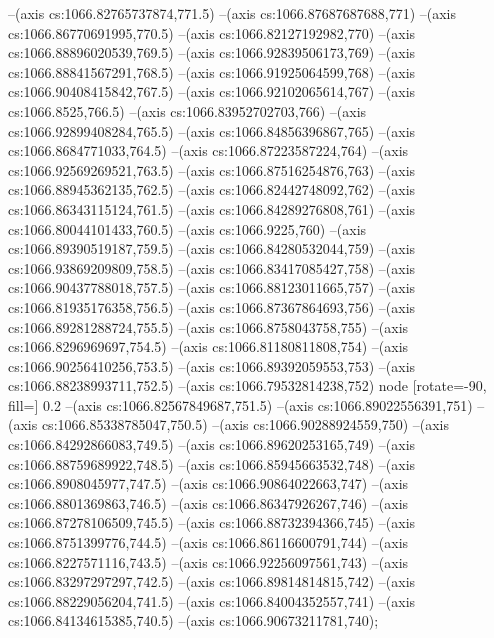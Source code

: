 --(axis cs:1066.82765737874,771.5)
--(axis cs:1066.87687687688,771)
--(axis cs:1066.86770691995,770.5)
--(axis cs:1066.82127192982,770)
--(axis cs:1066.88896020539,769.5)
--(axis cs:1066.92839506173,769)
--(axis cs:1066.88841567291,768.5)
--(axis cs:1066.91925064599,768)
--(axis cs:1066.90408415842,767.5)
--(axis cs:1066.92102065614,767)
--(axis cs:1066.8525,766.5)
--(axis cs:1066.83952702703,766)
--(axis cs:1066.92899408284,765.5)
--(axis cs:1066.84856396867,765)
--(axis cs:1066.8684771033,764.5)
--(axis cs:1066.87223587224,764)
--(axis cs:1066.92569269521,763.5)
--(axis cs:1066.87516254876,763)
--(axis cs:1066.88945362135,762.5)
--(axis cs:1066.82442748092,762)
--(axis cs:1066.86343115124,761.5)
--(axis cs:1066.84289276808,761)
--(axis cs:1066.80044101433,760.5)
--(axis cs:1066.9225,760)
--(axis cs:1066.89390519187,759.5)
--(axis cs:1066.84280532044,759)
--(axis cs:1066.93869209809,758.5)
--(axis cs:1066.83417085427,758)
--(axis cs:1066.90437788018,757.5)
--(axis cs:1066.88123011665,757)
--(axis cs:1066.81935176358,756.5)
--(axis cs:1066.87367864693,756)
--(axis cs:1066.89281288724,755.5)
--(axis cs:1066.8758043758,755)
--(axis cs:1066.8296969697,754.5)
--(axis cs:1066.81180811808,754)
--(axis cs:1066.90256410256,753.5)
--(axis cs:1066.89392059553,753)
--(axis cs:1066.88238993711,752.5)
--(axis cs:1066.79532814238,752) node [rotate=-90, fill=\bgcol] {0.2}
--(axis cs:1066.82567849687,751.5)
--(axis cs:1066.89022556391,751)
--(axis cs:1066.85338785047,750.5)
--(axis cs:1066.90288924559,750)
--(axis cs:1066.84292866083,749.5)
--(axis cs:1066.89620253165,749)
--(axis cs:1066.88759689922,748.5)
--(axis cs:1066.85945663532,748)
--(axis cs:1066.8908045977,747.5)
--(axis cs:1066.90864022663,747)
--(axis cs:1066.8801369863,746.5)
--(axis cs:1066.86347926267,746)
--(axis cs:1066.87278106509,745.5)
--(axis cs:1066.88732394366,745)
--(axis cs:1066.8751399776,744.5)
--(axis cs:1066.86116600791,744)
--(axis cs:1066.8227571116,743.5)
--(axis cs:1066.92256097561,743)
--(axis cs:1066.83297297297,742.5)
--(axis cs:1066.89814814815,742)
--(axis cs:1066.88229056204,741.5)
--(axis cs:1066.84004352557,741)
--(axis cs:1066.84134615385,740.5)
--(axis cs:1066.90673211781,740);

